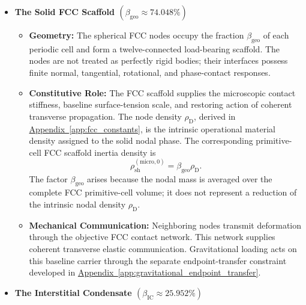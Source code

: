 \begin{itemize}

    \item \textbf{The Solid FCC Scaffold \texorpdfstring{$(\beta_{\mathrm{geo}} \approx 74.048\%)$}{(approximately 74.048 percent)}}

    \begin{itemize}

        \item \textbf{Geometry:}
        The spherical FCC nodes occupy the fraction $\beta_{\mathrm{geo}}$ of each periodic cell and form a twelve-connected load-bearing scaffold. The nodes are not treated as perfectly rigid bodies; their interfaces possess finite normal, tangential, rotational, and phase-contact responses.

        \item \textbf{Constitutive Role:}
        The FCC scaffold supplies the microscopic contact stiffness, baseline surface-tension scale, and restoring action of coherent transverse propagation. The node density $\rho_{\mathrm{D}}$, derived in \hyperref[app:fcc_constants]{Appendix~\ref*{app:fcc_constants}}, is the intrinsic operational material density assigned to the solid nodal phase. The corresponding primitive-cell FCC scaffold inertia density is
        \begin{equation}
            \rho_{\mathrm{sh}}^{(\mathrm{micro},0)} = \beta_{\mathrm{geo}}\rho_{\mathrm{D}}.
            \label{eq:sec34_micro_scaffold_density}
        \end{equation}
        The factor $\beta_{\mathrm{geo}}$ arises because the nodal mass is averaged over the complete FCC primitive-cell volume; it does not represent a reduction of the intrinsic nodal density $\rho_{\mathrm{D}}$.

        \item \textbf{Mechanical Communication:}
        Neighboring nodes transmit deformation through the objective FCC contact network. This network supplies coherent transverse elastic communication. Gravitational loading acts on this baseline carrier through the separate endpoint-transfer constraint developed in \hyperref[app:gravitational_endpoint_transfer]{Appendix~\ref*{app:gravitational_endpoint_transfer}}.

    \end{itemize}

    \item \textbf{The Interstitial Condensate \texorpdfstring{$(\beta_{\mathrm{IC}} \approx 25.952\%)$}{(approximately 25.952 percent)}}


\end{itemize}
